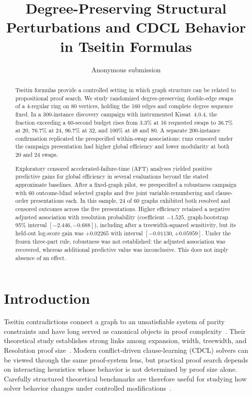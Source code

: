 \documentclass[11pt]{article}
\title{Degree-Preserving Structural Perturbations and CDCL Behavior in Tseitin Formulas}
\author{Anonymous submission}
\date{}
\begin{document}
\maketitle

\begin{abstract}
Tseitin formulas provide a controlled setting in which graph structure can be related to propositional proof search. We study randomized degree-preserving double-edge swaps of a 4-regular ring on 80 vertices, holding the 160 edges and complete degree sequence fixed. In a 300-instance discovery campaign with instrumented Kissat~4.0.4, the fraction exceeding a 60-second budget rises from 3.3\% at 16 requested swaps to 36.7\% at 20, 76.7\% at 24, 96.7\% at 32, and 100\% at 48 and 80. A separate 200-instance confirmation replicated the prespecified within-swap associations: runs censored under the campaign presentation had higher global efficiency and lower modularity at both 20 and 24 swaps.

Exploratory censored accelerated-failure-time (AFT) analyses yielded positive predictive gains for global efficiency in several evaluations beyond the stated approximate baselines. After a fixed-graph pilot, we prespecified a robustness campaign with 60 outcome-blind selected graphs and five joint variable-renumbering and clause-order presentations each. In this sample, 24 of 60 graphs exhibited both resolved and censored outcomes across the five presentations. Higher efficiency retained a negative adjusted association with resolution probability (coefficient $-1.525$, graph-bootstrap 95\% interval $[-2.446,-0.688]$), including after a treewidth-squared sensitivity, but its held-out log-score gain was $+0.02265$ with interval $[-0.01130,+0.05959]$. Under the frozen three-part rule, robustness was not established: the adjusted association was recovered, whereas additional predictive value was inconclusive. This does not imply absence of an effect.
\end{abstract}

\section{Introduction}

Tseitin contradictions connect a graph to an unsatisfiable system of parity constraints and have long served as canonical objects in proof complexity~\cite{Tseitin1970,BenSassonWigderson2001}. Their theoretical study establishes strong links among expansion, width, treewidth, and Resolution proof size~\cite{AlekhnovichRazborov2011,ItsyksonEtAl2022,deColnetMengel2023}. Modern conflict-driven clause-learning (CDCL) solvers can be viewed through the same proof-system lens, but practical proof search depends on interacting heuristics whose behavior is not determined by proof size alone. Carefully structured theoretical benchmarks are therefore useful for studying how solver behavior changes under controlled modifications~\cite{ElffersEtAl2018}.
\end{document}
